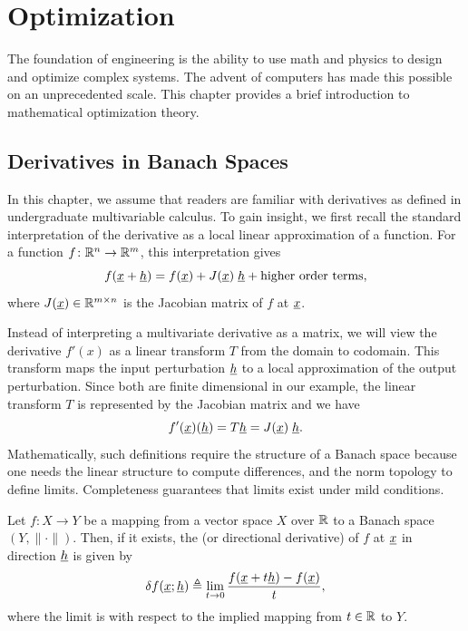\chapter{Optimization}



The foundation of engineering is the ability to use math and physics to design and optimize complex systems.
The advent of computers has made this possible on an unprecedented scale.
This chapter provides a brief introduction to mathematical optimization theory.

\section{Derivatives in Banach Spaces}

In this chapter, we assume that readers are familiar with derivatives as defined in undergraduate multivariable calculus.
To gain insight, we first recall the standard interpretation of the derivative as a local linear approximation of a function.
For a function $f\colon \mathbb{R}^n \to \mathbb{R}^m$, this interpretation gives 
\[ f(\underline{x} + \underline{h}) = f(\underline{x}) + J(\underline{x}) \; \underline{h} + \text{higher order terms}, \]
where $J(\underline{x})\in \mathbb{R}^{m\times n}$ is the Jacobian matrix of $f$ at $\underline{x}$.

Instead of interpreting a multivariate derivative as a matrix,  we will view the derivative $f'(x)$ as a linear transform $T$ from the domain to codomain.
This transform maps the input perturbation $\underline{h}$ to a local approximation of the output perturbation.
Since both are finite dimensional in our example, the linear transform $T$ is represented by the Jacobian matrix and we have
\begin{equation*}
f'(\underline{x})(\underline{h}) = T \underline{h} = J(\underline{x}) \; \underline{h} .
\end{equation*}
Mathematically, such definitions require the structure of a Banach space because one needs the linear structure to compute differences, and the norm topology to define limits.
Completeness guarantees that limits exist under mild conditions.

\begin{definition}
Let $f \colon X \rightarrow Y$ be a mapping from a vector space $X$ over $\mathbb{R}$ to a Banach space $(Y,\|\cdot\|)$.
Then, if it exists, the  (or directional derivative) of $f$ at $\underline{x}$ in direction $\underline{h}$ is given by
\[ \delta f (\underline{x};\underline{h}) \triangleq \lim_{t \to 0} \frac{f(\underline{x}+t \underline{h}) - f(\underline{x})}{t}, \]
where the limit is with respect to the implied mapping from $t\in \mathbb{R}$ to $Y$.
\end{definition}

